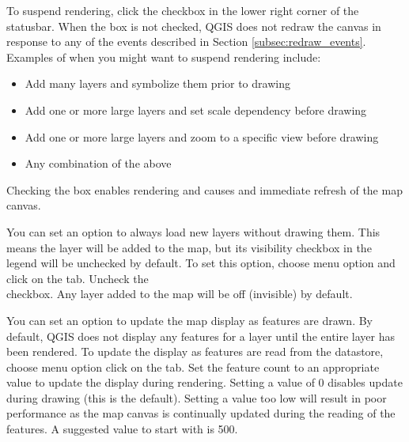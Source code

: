 To suspend rendering, click the  checkbox in the lower right
corner of the statusbar. When the  box is not checked, QGIS
does not redraw the canvas in response to any of the events described in
Section \ref{subsec:redraw_events}. Examples of when you might want to suspend
rendering include:

\begin{itemize}
\item Add many layers and symbolize them prior to drawing
\item Add one or more large layers and set scale dependency before drawing
\item Add one or more large layers and zoom to a specific view before drawing
\item Any combination of the above
\end{itemize}

Checking the  box enables rendering and causes and immediate
refresh of the map canvas.

\label{label_settinglayer}

You can set an option to always load new layers without drawing them. This
means the layer will be added to the map, but its visibility checkbox in the
legend will be unchecked by default. To set this option, choose
menu option  \arrow {} and click on the
 tab. Uncheck the \\
 checkbox.
Any layer added to the map will be off (invisible) by default.

%
%

\label{label_updatemap}

You can set an option to update the map display as features are drawn. By
default, QGIS does not display any features for a layer until the entire
layer has been rendered. To update the display as features are read from the
datastore, choose menu option  \arrow {}
click on the  tab. Set the feature count to an
appropriate value to update the display during rendering. Setting a value of 0
disables update during drawing (this is the default). Setting a value too low
will result in poor performance as the map canvas is continually updated
during the reading of the features. A suggested value to start with is 500.

